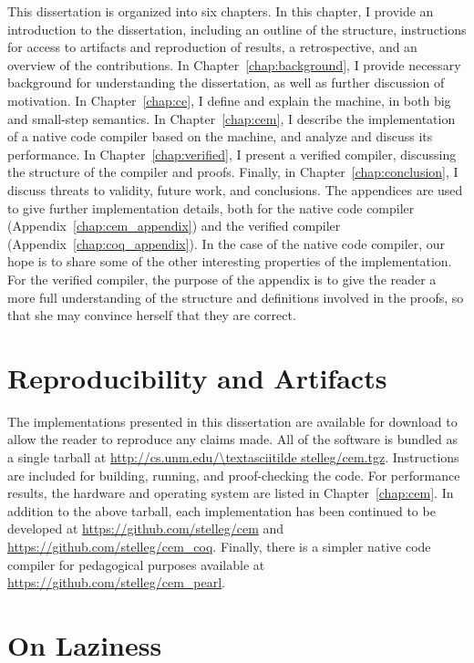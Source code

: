 This dissertation is organized into six chapters. In this chapter, I provide
an introduction to the dissertation, including an outline of the structure,
instructions for access to artifacts and reproduction of results, a
retrospective, and an overview of the contributions. In
Chapter~\ref{chap:background}, I provide necessary background for understanding
the dissertation, as well as further discussion of motivation. In
Chapter~\ref{chap:ce}, I define and explain the \ce machine, in both big and
small-step semantics. In Chapter~\ref{chap:cem}, I describe the implementation
of a native code compiler based on the \ce machine, and analyze and discuss its
performance. In Chapter~\ref{chap:verified}, I present a verified compiler,
discussing the structure of the compiler and proofs. Finally, in
Chapter~\ref{chap:conclusion}, I discuss threats to validity, future work, and
conclusions. The appendices are used to give further implementation details,
both for the native code compiler (Appendix~\ref{chap:cem_appendix}) and the
verified compiler (Appendix~\ref{chap:coq_appendix}). In the case of the native
code compiler, our hope is to share some of the other interesting properties of
the implementation.  For the verified compiler, the purpose of the appendix is
to give the reader a more full understanding of the structure and definitions
involved in the proofs, so that she may convince herself that they are correct.

\section{Reproducibility and Artifacts}

The implementations presented in this dissertation are available for download to
allow the reader to reproduce any claims made. All of the software is bundled as
a single tarball at \url{http://cs.unm.edu/\textasciitilde stelleg/cem.tgz}.
Instructions are included for building, running, and proof-checking the code.
For performance results, the hardware and operating system are listed in
Chapter~\ref{chap:cem}. In addition to the above tarball, each implementation has been
continued to be developed at \url{https://github.com/stelleg/cem} and
\url{https://github.com/stelleg/cem\_coq}. Finally, there is a simpler native
code compiler for pedagogical purposes available at
\url{https://github.com/stelleg/cem\_pearl}. 

\section{On Laziness}

